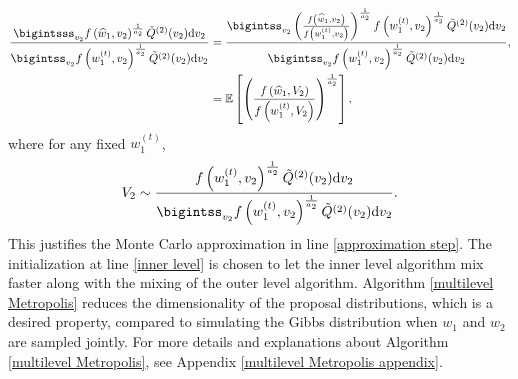 \documentclass{article}
\newcommand{\E}{\mathbb{E}}
\begin{document}
\begin{align}
	\frac{\bigintsss_{v_2}f\left(\widehat{w}_1,v_2\right)^{\frac{1}{a_2}} \tilde{Q}^{(2)}(v_2)\mathrm{d}v_2}{\bigintss_{v_2}f\left(w_1^{(t)},v_2\right)^{\frac{1}{a_2}} \tilde{Q}^{(2)}(v_2)\mathrm{d}v_2}&=\frac{\bigintss_{v_2}\left(\frac{f\left(\widehat{w}_1,v_2\right)}{f\left(w_1^{(t)},v_2\right)}\right)^{\frac{1}{a_2}} f\left(w_1^{(t)},v_2\right)^{\frac{1}{a_2}}\tilde{Q}^{(2)}(v_2)\mathrm{d}v_2}{\bigintss_{v_2}f\left(w_1^{(t)},v_2\right)^{\frac{1}{a_2}} \tilde{Q}^{(2)}(v_2)\mathrm{d}v_2},\nonumber\\
	&=\E\left[\left(\frac{f\left(\widehat{w}_1,V_2\right)}{f\left(w_1^{(t)},V_2\right)}\right)^{\frac{1}{a_2}} \right],\nonumber
\end{align}
where for any fixed $w_1^{(t)}$,
\begin{equation}
    V_2\sim \frac{ f\left(w_1^{(t)},v_2\right)^{\frac{1}{a_2}}\tilde{Q}^{(2)}(v_2)\mathrm{d}v_2}{\bigintss_{v_2}f\left(w_1^{(t)},v_2\right)^{\frac{1}{a_2}} \tilde{Q}^{(2)}(v_2)\mathrm{d}v_2}.\nonumber
\end{equation}
This justifies the Monte Carlo approximation in line \ref{approximation step}. 
 The initialization at line \ref{inner level} is chosen to let the inner level algorithm mix faster along with the mixing of the outer level algorithm.  Algorithm \ref{multilevel Metropolis} reduces the dimensionality of the proposal distributions, which is a desired property, compared to simulating the Gibbs distribution when $w_1$ and $w_2$ are sampled jointly. For more details and explanations about Algorithm \ref{multilevel Metropolis}, see Appendix \ref{multilevel Metropolis appendix}. 
\end{document}
